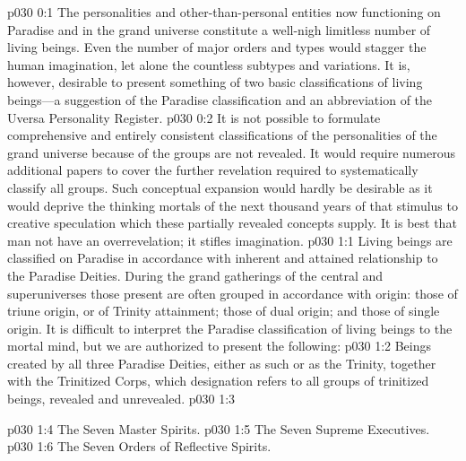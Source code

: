 \author{Mighty Messenger}
\vs p030 0:1 The personalities and other\hyp{}than\hyp{}personal entities now functioning on Paradise and in the grand universe constitute a well\hyp{}nigh limitless number of living beings. Even the number of major orders and types would stagger the human imagination, let alone the countless subtypes and variations. It is, however, desirable to present something of two basic classifications of living beings---a suggestion of the Paradise classification and an abbreviation of the Uversa Personality Register.\plusone
\vs p030 0:2 It is not possible to formulate comprehensive and entirely consistent classifications of the personalities of the grand universe because  of the groups are not revealed. It would require numerous additional papers to cover the further revelation required to systematically classify all groups. Such conceptual expansion would hardly be desirable as it would deprive the thinking mortals of the next thousand years of that stimulus to creative speculation which these partially revealed concepts supply. It is best that man not have an overrevelation; it stifles imagination.
%
\vs p030 1:1 Living beings are classified on Paradise in accordance with inherent and attained relationship to the Paradise Deities. During the grand gatherings of the central and superuniverses those present are often grouped in accordance with origin: those of triune origin, or of Trinity attainment; those of dual origin; and those of single origin. It is difficult to interpret the Paradise classification of living beings to the mortal mind, but we are authorized to present the following:
\pc \vs p030 1:2 \bibnobreakspace {} Beings created by all three Paradise Deities, either as such or as the Trinity, together with the Trinitized Corps, which designation refers to all groups of trinitized beings, revealed and unrevealed.
\pc \vs p030 1:3 \bibnobreakspace {}
\begin{ubquote}
\pc \vs p030 1:4 \bibnobreakspace The Seven Master Spirits.
\vs p030 1:5 \bibnobreakspace The Seven Supreme Executives.
\vs p030 1:6 \bibnobreakspace The Seven Orders of Reflective Spirits.
\end{ubquote}
